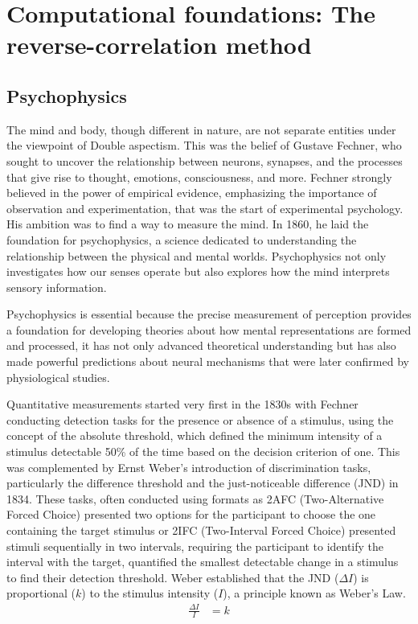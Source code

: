 \renewcommand{\chaptername}{Chapter} 
\chapter{Computational foundations: The reverse-correlation method}\label{chap3}


\section {Psychophysics} 

The mind and body, though different in nature, are not separate entities under the viewpoint of Double aspectism. This was the belief of Gustave Fechner, who sought to uncover the relationship between neurons, synapses, and the processes that give rise to thought, emotions, consciousness, and more. Fechner strongly believed in the power of empirical evidence, emphasizing the importance of observation and experimentation, that was the start of experimental psychology. His ambition was to find a way to measure the mind. In 1860, he laid the foundation for psychophysics, a science dedicated to understanding the relationship between the physical and mental worlds. Psychophysics not only investigates how our senses operate but also explores how the mind interprets sensory information.

Psychophysics is essential because the precise measurement of perception provides a foundation for developing theories about how mental representations are formed and processed, it has not only advanced theoretical understanding but has also made powerful predictions about neural mechanisms that were later confirmed by physiological studies. 

Quantitative measurements started very first in the 1830s with Fechner conducting detection tasks for the presence or absence of a stimulus, using the concept of the absolute threshold, which defined the minimum intensity of a stimulus detectable 50\% of the time  based on the decision criterion of one. This was complemented by Ernst Weber’s introduction of discrimination tasks, particularly the difference threshold and the just-noticeable difference (JND) in 1834. These tasks, often conducted using formats as 2AFC (Two-Alternative Forced Choice) presented two options for the participant to choose the one containing the target stimulus or 2IFC (Two-Interval Forced Choice) presented stimuli sequentially in two intervals, requiring the participant to identify the interval with the target, quantified the smallest detectable change in a stimulus to find their detection threshold. Weber established that the JND ($\Delta I$) is proportional ($k$) to the stimulus intensity ($I$), a principle known as Weber’s Law. \cite{falmagne_elements_1985}
\begin{align}
\frac{\Delta I}{I}& = k 
\end{align}

